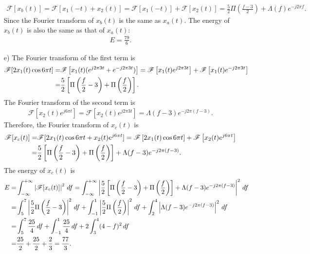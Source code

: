\documentclass{assignment}
\begin{document}
\begin{sol}
\begin{itemize}
        \begin{align}
            \mathscr{F}[x_b(t)]=\mathscr{F}[x_1(-t)+x_2(t)]=\mathscr{F}[x_1(-t)]+\mathscr{F}[x_2(t)]=\frac{5}{2}\Pi\left(\frac{f-3}{2}\right)+\Lambda(f)e^{-j2\pi f}.
        \end{align}
        Since the Fourier transform of $x_b(t)$ is the same as $x_a(t)$. The energy of $x_b(t)$ is also the same as that of $x_a(t)$:
        \begin{align}
            E=\frac{79}{6}.
        \end{align}
        \item[e)] The Fourier transform of the first term is
        \begin{align}
            \notag\mathscr{F}[2x_1(t)\cos 6\pi t]=&\mathscr{F}\left[x_1(t)(e^{j2\pi 3t}+e^{-j2\pi 3t})\right]=\mathscr{F}\left[x_1(t)e^{j2\pi 3t}\right]+\mathscr{F}\left[x_1(t)e^{-j2\pi 3t}\right]\\
            =&\frac{5}{2}\left[\Pi\left(\frac{f}{2}-3\right)+\Pi\left(\frac{f}{2}\right)\right].
        \end{align}
        The Fourier transform of the second term is
        \begin{align}
            \mathscr{F}\left[x_2(t)e^{j6\pi t}\right]=\mathscr{F}\left[x_2(t)e^{j2\pi 3t}\right]=\Lambda(f-3)e^{-j2\pi(f-3)}.
        \end{align}
        Therefore, the Fourier transform of $x_c(t)$ is
        \begin{align}
            \notag\mathscr{F}[x_c(t)]=&\mathscr{F}[2x_1(t)\cos 6\pi t+x_2(t)e^{j6\pi t}]=\mathscr{F}\left[2x_1(t)\cos 6\pi t\right]+\mathscr{F}\left[x_2(t)e^{j6\pi t}\right]\\
            =&\frac{5}{2}\left[\Pi\left(\frac{f}{2}-3\right)+\Pi\left(\frac{f}{2}\right)\right]+\Lambda(f-3)e^{-j2\pi(f-3)}.
        \end{align}
        The energy of $x_c(t)$ is
        \begin{align}
            \notag E=&\int_{-\infty}^{+\infty}\left\lvert\mathscr{F}[x_c(t)]\right\rvert^2\,df=\int_{-\infty}^{+\infty}\left\lvert\frac{5}{2}\left[\Pi\left(\frac{f}{2}-3\right)+\Pi\left(\frac{f}{2}\right)\right]+\Lambda(f-3)e^{-j2\pi(f-3)}\right\rvert^2\,df\\
            \notag=&\int_5^7\left\lvert\frac{5}{2}\Pi\left(\frac{f}{2}-3\right)\right\rvert^2\,df+\int_{-1}^1\left\lvert\frac{5}{2}\Pi\left(\frac{f}{2}\right)\right\rvert^2\,df+\int_2^4\left\lvert\Lambda(f-3)e^{-j2\pi(f-3)}\right\rvert^2\,df\\
            \notag=&\int_5^7\frac{25}{4}\,df+\int_{-1}^1\frac{25}{4}\,df+2\int_3^4(4-f)^2\,df\\
            =&\frac{25}{2}+\frac{25}{2}+\frac{2}{3}=\frac{77}{3}.
        \end{align}
    \end{itemize}
\end{sol}
\end{document}
